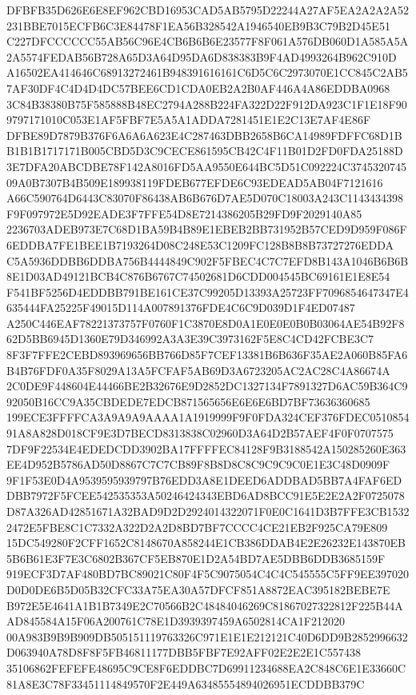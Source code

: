 \documentclass[UTF8,fontset=fandol,zihao=-4,a4paper]{ctexart}
\begin{document}
{{DFBFB35D626E6E8EF962CBD16953CAD5AB5795D22244A27AF5EA2A2A2A52231BBE7015ECFB6C3E84478F1EA56B328542A1946540EB9B3C79B2D45E51
C227DFCCCCCC55AB56C96E4CB6B6B6E23577F8F061A576DB060D1A585A5A2A5574FEDAB56B728A65D3A64D95DA6D838383B9F4AD4993264B962C910D
A16502EA414646C68913272461B948391616161C6D5C6C2973070E1CC845C2AB57AF30DF4C4D4D4DC57BEE6CD1CDA0EB2A2B0AF446A4A86EDDBA0968
3C84B38380B75F585888B48EC2794A288B224FA322D22F912DA923C1F1E18F909797171010C053E1AF5FBF7E5A5A1ADDA7281451E1E2C13E7AF4E86F
DFBE89D7879B376F6A6A6A623E4C287463DBB2658B6CA14989FDFFC68D1BB1B1B1717171B005CBD5D3C9CECE861595CB42C4F11B01D2FD0FDA25188D
3E7DFA20ABCDBE78F142A8016FD5AA9550E644BC5D51C092224C374532074509A0B7307B4B509E189938119FDEB677EFDE6C93EDEAD5AB04F7121616
A66C590764D6443C83070F86438AB6B676D7AE5D070C18003A243C1143434398F9F097972E5D92EADE3F7FFE54D8E7214386205B29FD9F2029140A85
2236703ADEB973E7C68D1BA59B4B89E1EBEB2BB731952B57CED9D959F086F6EDDBA7FE1BEE1B7193264D08C248E53C1209FC128B8B8B73727276EDDA
C5A5936DDBB6DDBA756B4444849C902F5FBEC4C7C7EFD8B143A1046B6B6B8E1D03AD49121BCB4C876B6767C74502681D6CDD004545BC69161E1E8E54
F541BF5256D4EDDBB791BE161CE37C99205D13393A25723FF7096854647347E4635444FA25225F49015D114A007891376FDE4C6C9D039D1F4ED07487
A250C446EAF78221373757F0760F1C3870E8D0A1E0E0E0B0B03064AE54B92F862D5BB6945D1360E79D346992A3A3E39C3973162F5E8C4CD42FCBE3C7
8F3F7FFE2CEBD893969656BB766D85F7CEF13381B6B636F35AE2A060B85FA6B4B76FDF0A35F8029A13A5FCFAF5AB69D3A6723205AC2AC28C4A86674A
2C0DE9F448604E44466BE2B32676E9D2852DC1327134F7891327D6AC59B364C992050B16CC9A35CBDEDE7EDCB871565656E6E6E6BD7BF73636360685
199ECE3FFFFCA3A9A9A9AAAA1A1919999F9F0FDA324CEF376FDEC051085491A8A828D018CF9E3D7BECD8313838C02960D3A64D2B57AEF4F0F0707575
7DF9F22534E4EDEDCDD3902BA17FFFFEC84128F9B3188542A150285260E363EE4D952B5786AD50D8867C7C7CB89F8B8D8C8C9C9C9C0E1E3C48D0909F
9F1F53E0D4A9539595939797B76EDD3A8E1DEED6ADDBAD5BB7A4FAF6EDDBB7972F5FCEE542535353A50246424343EBD6AD8BCC91E5E2E2A2F0725078
D87A326AD42851671A32BAD9D2D2924014322071F0E0C1641D3B7FFE3CB15322472E5FBE8C1C7332A322D2A2D8BD7BF7CCCC4CE21EB2F925CA79E809
15DC549280F2CFF1652C8148670A858244E1CB386DDAB4E2E26232E143870EB5B6B61E3F7E3C6802B367CF5EB870E1D2A54BD7AE5DBB6DDB3685159F
919ECF3D7AF480BD7BC89021C80F4F5C9075054C4C4C545555C5FF9EE397020D0D0DE6B5D05B32CFC33A75EA30A57DFCF851A8872EAC395182BEBE7E
B972E5E4641A1B1B7349E2C70566B2C48484046269C81867027322812F225B44AAD845584A15F06A200761C78E1D3939397459A6502814CA1F212020
00A983B9B9B909DB505151119763326C971E1E1E212121C40D6DD9B2852996632D063940A78D8F8F5FB46811177DBB5FBF7E92AFF02E2E2E1C557438
35106862FEFEFE48695C9CE8F6EDDBC7D69911234688EA2C848C6E1E33660C81A8E3C78F33451114849570F2E449A63485554894026951ECDDBB379C
}}
\end{document}
